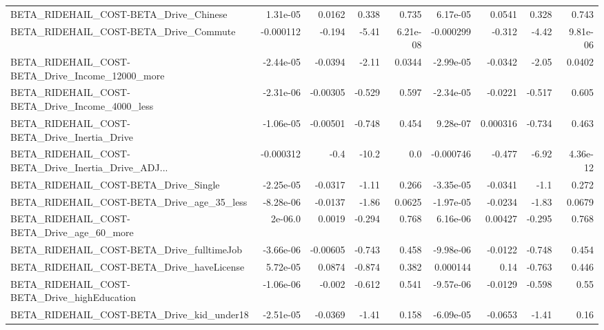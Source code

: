 \begin{tabular}{lrrrrrrrr}
BETA\_RIDEHAIL\_COST-BETA\_Drive\_Chinese              &    1.31e-05 &       0.0162 &    0.338 &    0.735 &   6.17e-05 &      0.0541 &        0.328 &         0.743 \\
BETA\_RIDEHAIL\_COST-BETA\_Drive\_Commute              &   -0.000112 &       -0.194 &    -5.41 & 6.21e-08 &  -0.000299 &      -0.312 &        -4.42 &      9.81e-06 \\
BETA\_RIDEHAIL\_COST-BETA\_Drive\_Income\_12000\_more    &   -2.44e-05 &      -0.0394 &    -2.11 &   0.0344 &  -2.99e-05 &     -0.0342 &        -2.05 &        0.0402 \\
BETA\_RIDEHAIL\_COST-BETA\_Drive\_Income\_4000\_less     &   -2.31e-06 &     -0.00305 &   -0.529 &    0.597 &  -2.34e-05 &     -0.0221 &       -0.517 &         0.605 \\
BETA\_RIDEHAIL\_COST-BETA\_Drive\_Inertia\_Drive        &   -1.06e-05 &     -0.00501 &   -0.748 &    0.454 &   9.28e-07 &    0.000316 &       -0.734 &         0.463 \\
BETA\_RIDEHAIL\_COST-BETA\_Drive\_Inertia\_Drive\_ADJ... &   -0.000312 &         -0.4 &    -10.2 &      0.0 &  -0.000746 &      -0.477 &        -6.92 &      4.36e-12 \\
BETA\_RIDEHAIL\_COST-BETA\_Drive\_Single               &   -2.25e-05 &      -0.0317 &    -1.11 &    0.266 &  -3.35e-05 &     -0.0341 &         -1.1 &         0.272 \\
BETA\_RIDEHAIL\_COST-BETA\_Drive\_age\_35\_less          &   -8.28e-06 &      -0.0137 &    -1.86 &   0.0625 &  -1.97e-05 &     -0.0234 &        -1.83 &        0.0679 \\
BETA\_RIDEHAIL\_COST-BETA\_Drive\_age\_60\_more          &     2e-06.0 &       0.0019 &   -0.294 &    0.768 &   6.16e-06 &     0.00427 &       -0.295 &         0.768 \\
BETA\_RIDEHAIL\_COST-BETA\_Drive\_fulltimeJob          &   -3.66e-06 &     -0.00605 &   -0.743 &    0.458 &  -9.98e-06 &     -0.0122 &       -0.748 &         0.454 \\
BETA\_RIDEHAIL\_COST-BETA\_Drive\_haveLicense          &    5.72e-05 &       0.0874 &   -0.874 &    0.382 &   0.000144 &        0.14 &       -0.763 &         0.446 \\
BETA\_RIDEHAIL\_COST-BETA\_Drive\_highEducation        &   -1.06e-06 &       -0.002 &   -0.612 &    0.541 &  -9.57e-06 &     -0.0129 &       -0.598 &          0.55 \\
BETA\_RIDEHAIL\_COST-BETA\_Drive\_kid\_under18          &   -2.51e-05 &      -0.0369 &    -1.41 &    0.158 &  -6.09e-05 &     -0.0653 &        -1.41 &          0.16 \\

\end{tabular}
